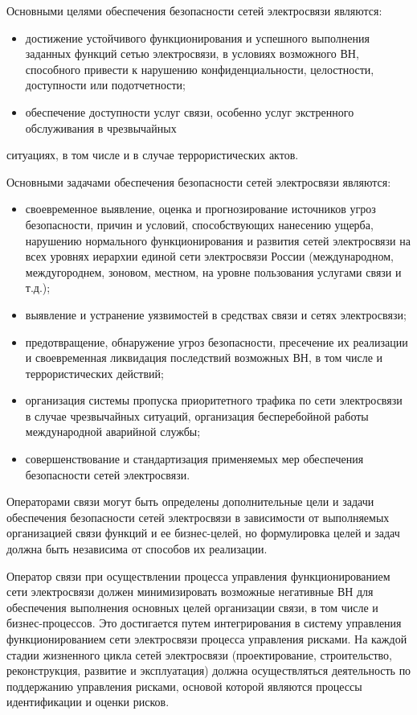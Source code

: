 \documentclass[12pt, russian, oneside, article]{ncc}
\begin{document}
Основными целями обеспечения безопасности сетей электросвязи являются:
\begin{itemize}
\item достижение устойчивого функционирования и успешного выполнения заданных функций сетью электросвязи, в условиях возможного ВН, способного привести  к нарушению конфиденциальности, целостности, доступности или подотчетности;
\item обеспечение доступности услуг связи, особенно услуг экстренного обслуживания в чрезвычайных
\end{itemize}
ситуациях, в том числе и в случае террористических актов.

Основными задачами обеспечения безопасности сетей электросвязи являются:
\begin{itemize}
\item своевременное выявление, оценка и прогнозирование источников угроз безопасности, причин и условий, способствующих нанесению ущерба, нарушению нормального функционирования и развития сетей электросвязи на всех уровнях иерархии единой сети электросвязи России (международном, междугороднем, зоновом, местном, на уровне пользования услугами связи и т.д.);
\item выявление и устранение уязвимостей в средствах связи и сетях электросвязи;
\item предотвращение, обнаружение угроз безопасности, пресечение их реализации и своевременная ликвидация последствий возможных ВН, в том числе и террористических действий;
\item организация системы пропуска приоритетного трафика по сети электросвязи в случае чрезвычайных ситуаций, организация бесперебойной работы международной аварийной службы;
\item совершенствование и стандартизация применяемых мер обеспечения безопасности сетей электросвязи.
\end{itemize}

Операторами связи могут быть определены дополнительные цели и задачи обеспечения безопасности сетей электросвязи в зависимости от выполняемых организацией связи функций и ее бизнес-целей, но формулировка целей и задач должна быть независима от способов их реализации.

Оператор связи при осуществлении процесса управления функционированием сети электросвязи должен минимизировать возможные негативные ВН для обеспечения выполнения основных целей организации связи, в том числе и бизнес-процессов. Это достигается путем интегрирования в систему управления функционированием сети электросвязи процесса управления рисками. На каждой стадии жизненного цикла сетей электросвязи (проектирование, строительство, реконструкция, развитие и эксплуатация) должна осуществляться деятельность по поддержанию управления рисками, основой которой являются процессы идентификации и оценки рисков. 
\end{document}

